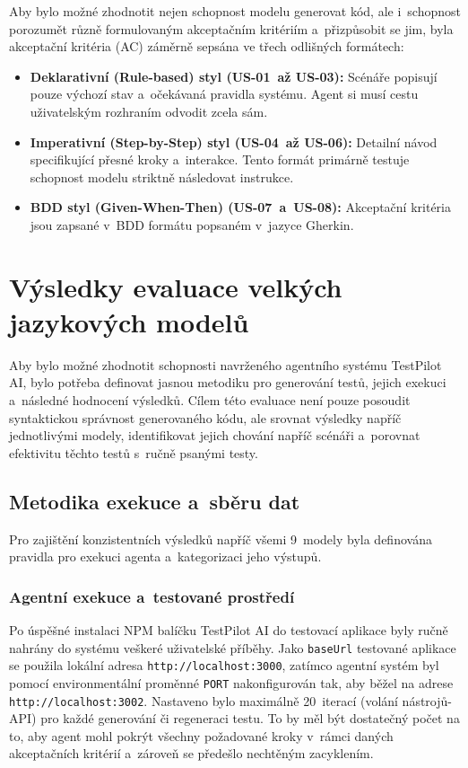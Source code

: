 \documentclass[czech, ing, kiv, he, iso690numb, viewonly]{fasthesis}
\begin{document}
Aby bylo možné zhodnotit nejen schopnost modelu generovat kód, ale i~schopnost porozumět různě formulovaným akceptačním kritériím a~přizpůsobit se jim,
byla akceptační kritéria (AC) záměrně sepsána ve třech odlišných formátech:

\begin{itemize}
    \item \textbf{Deklarativní (Rule-based) styl (US-01~až US-03):} Scénáře popisují pouze výchozí stav a~očekávaná 
    pravidla systému. Agent si musí cestu uživatelským rozhraním odvodit zcela sám.
    \item \textbf{Imperativní (Step-by-Step) styl (US-04~až US-06):} Detailní návod specifikující přesné kroky a~interakce. 
    Tento formát primárně testuje schopnost modelu striktně následovat instrukce.
    \item \textbf{BDD styl (Given-When-Then) (US-07~a~US-08):} Akceptační kritéria jsou zapsané v~BDD formátu popsaném v~jazyce Gherkin.
\end{itemize}


\section{Výsledky evaluace velkých jazykových modelů}

Aby bylo možné zhodnotit schopnosti navrženého agentního systému TestPilot AI, 
bylo potřeba definovat jasnou metodiku pro generování testů, jejich exekuci a~následné hodnocení výsledků.
Cílem této evaluace není pouze posoudit syntaktickou správnost generovaného kódu, ale srovnat výsledky napříč
jednotlivými modely, identifikovat jejich chování napříč scénáři a~porovnat efektivitu těchto testů 
s~ručně psanými testy.


\subsection{Metodika exekuce a~sběru dat}\label{subsection:metodika-exekuce}

Pro zajištění konzistentních výsledků napříč všemi 9~modely byla definována pravidla pro exekuci agenta a~kategorizaci jeho výstupů. 

\subsubsection*{Agentní exekuce a~testované prostředí}
Po úspěšné instalaci NPM balíčku TestPilot AI do testovací aplikace 
byly ručně nahrány do systému veškeré uživatelské příběhy. Jako \texttt{baseUrl} testované
aplikace se použila lokální adresa \texttt{http://localhost:3000}, 
zatímco agentní systém byl pomocí environmentální proměnné \texttt{PORT} nakonfigurován tak, aby běžel na 
adrese \texttt{http://localhost:3002}. 
Nastaveno bylo maximálně 20~iterací (volání nástrojů-API) pro každé generování či regeneraci testu.
To by měl být dostatečný počet na to, aby agent mohl pokrýt všechny požadované kroky v~rámci 
daných akceptačních kritérií a~zároveň se předešlo nechtěným zacyklením. 
\end{document}
